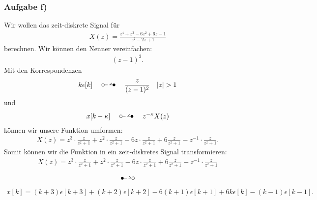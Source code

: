 \subsubsection{Aufgabe f)}
Wir wollen das zeit-diskrete Signal für
\begin{align}
	X(z)=\frac{z^4+z^3-6z^2+6z-1}{z^2-2z+1}
\end{align}
berechnen.
Wir können den Nenner vereinfachen:
\begin{align}
	(z-1)^2.
\end{align}
Mit den Korrespondenzen
\begin{align}
	k\epsilon[k]\quad\ztransf\quad\frac{z}{(z-1)^2}\quad |z|>1
\end{align}
und
\begin{align}
	x[k-\kappa]\quad\ztransf\quad z^{-\kappa}X(z)
\end{align}
können wir unsere Funktion umformen:
\begin{align}
	X(z)=z^3\cdot\frac{z}{z^2+1}+z^2\cdot\frac{z}{z^2+1}-6z\cdot\frac{z}{z^2+1}+6\frac{z}{z^2+1}-z^{-1}\cdot\frac{z}{z^2+1}.
\end{align}
Somit können wir die Funktion in ein zeit-diskretes Signal transformieren:
\begin{align}
	X(z)=z^3\cdot\frac{z}{z^2+1}+z^2\cdot\frac{z}{z^2+1}-6z\cdot\frac{z}{z^2+1}+6\frac{z}{z^2+1}-z^{-1}\cdot\frac{z}{z^2+1} \nonumber
\end{align}
\begin{align}
	\Ztransf \nonumber
\end{align}
\begin{align}
	x[k]=(k+3)\epsilon[k+3]+(k+2)\epsilon[k+2]-6(k+1)\epsilon[k+1]+6k\epsilon[k]-(k-1)\epsilon[k-1].
\end{align}
